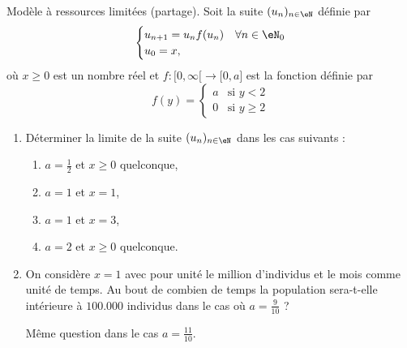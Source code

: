
\begin{exercice}\label{exoTD3-0008}

	Modèle à ressources limitées (partage). Soit la suite $(u_n)_{n\in\eN}$ définie par
	\begin{equation}
		\begin{cases}
			u_{n+1}=u_nf(u_n)	&	\forall n\in\eN_0\\
			u_0=x,
		\end{cases}
	\end{equation}
	où $x\geq 0$ est un nombre réel et $f\colon \mathopen[ 0 , \infty [\to \mathopen[ 0 , a \mathclose]$ est la fonction définie par
	\begin{equation}
		f(y)=\begin{cases}
			a	&	\text{si }y<2\\
			0	&	 \text{si }y\geq 2
		\end{cases}
	\end{equation}
	\begin{enumerate}
		\item
			Déterminer la limite de la suite $(u_n)_{n\in\eN}$ dans les cas suivants :
			\begin{enumerate}
				\item
					$a=\frac{ 1 }{2}$ et $x\geq 0$ quelconque,
				\item
					$a=1$ et $x=1$,
				\item
					$a=1$ et $x=3$,
				\item
					$a=2$ et $x\geq 0$ quelconque.
			\end{enumerate}
		\item
			On considère $x=1$ avec pour unité le million d'individus et le mois comme unité de temps. Au bout de combien de temps la population sera-t-elle intérieure à $100.000$ individus dans le cas où $a=\frac{ 9 }{ 10 }$ ?

			Même question dans le cas $a=\frac{ 11 }{ 10 }$.
	\end{enumerate}
	

\end{exercice}
